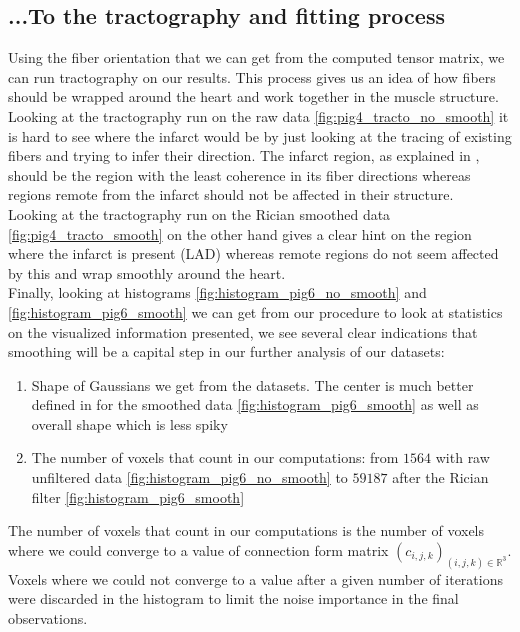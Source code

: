 \subsection{...To the tractography and fitting process}

Using the fiber orientation that we can get from the computed tensor matrix, we can run tractography on our results. This process gives us an idea of how fibers should be wrapped around the heart and work together in the muscle structure. Looking at the tractography run on the raw data \ref{fig:pig4_tracto_no_smooth} it is hard to see where the infarct would be by just looking at the tracing of existing fibers and trying to infer their direction. The infarct region, as explained in \cite{wu2007mr}, should be the region with the least coherence in its fiber directions whereas regions remote from the infarct should not be affected in their structure.\\
Looking at the tractography run on the Rician smoothed data \ref{fig:pig4_tracto_smooth} on the other hand gives a clear hint on the region where the infarct is present (LAD) whereas remote regions do not seem affected by this and wrap smoothly around the heart.\\
Finally, looking at histograms \ref{fig:histogram_pig6_no_smooth} and \ref{fig:histogram_pig6_smooth} we can get from our procedure to look at statistics on the visualized information presented, we see several clear indications that smoothing will be a capital step in our further analysis of our datasets:
\begin{enumerate}
    \item Shape of Gaussians we get from the datasets. The center is much better defined in for the smoothed data \ref{fig:histogram_pig6_smooth} as well as overall shape which is less spiky
    \item The number of voxels that count in our computations: from $1564$ with raw unfiltered data \ref{fig:histogram_pig6_no_smooth} to $59187$ after the Rician filter \ref{fig:histogram_pig6_smooth}
\end{enumerate}
The number of voxels that count in our computations is the number of voxels where we could converge to a value of connection form matrix $(c_{i, j, k})_{(i, j, k) \in \mathbb{R}^3}$. Voxels where we could not converge to a value after a given number of iterations were discarded in the histogram to limit the noise importance in the final observations.

